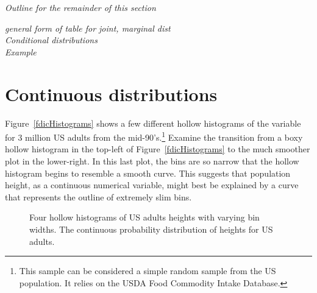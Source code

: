 \textit{Outline for the remainder of this section}

\textit{general form of table for joint, marginal dist \\
		Conditional distributions\\ Example}



\section{Continuous distributions}
\label{contDist}


Figure~\ref{fdicHistograms} shows a few different hollow histograms of the variable  for 3 million US adults from the mid-90's.\footnote{This sample can be considered a simple random sample from the US population. It relies on the USDA Food Commodity Intake Database.} Examine the transition from a boxy hollow histogram in the top-left of Figure~\ref{fdicHistograms} to the much smoother plot in the lower-right. In this last plot, the bins are so narrow that the hollow histogram begins to resemble a smooth curve. This suggests that population height, as a continuous numerical variable, might best be explained by a curve that represents the outline of extremely slim bins.

\begin{figure}[h!]
	\centering
	\caption{ Four hollow histograms of US adults heights with varying bin widths.  The continuous probability distribution of heights for US adults.}
\end{figure}


